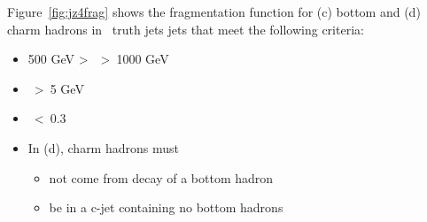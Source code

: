 Figure~\ref{fig:jz4frag} shows the fragmentation function for (c) bottom and (d) charm hadrons in  \antiktfour\ truth jets jets that meet the following criteria:
\begin{itemize}
\item 500 GeV \textgreater~\ptJet\ \textgreater~1000 GeV
\item \ptHad\ \textgreater~5 GeV
\item \drHadJet\ \textless~0.3
\item In (d), charm hadrons must 
\begin{itemize}
\item not come from decay of a bottom hadron
\item be in a c-jet containing no bottom hadrons
\end{itemize}
\end{itemize}





